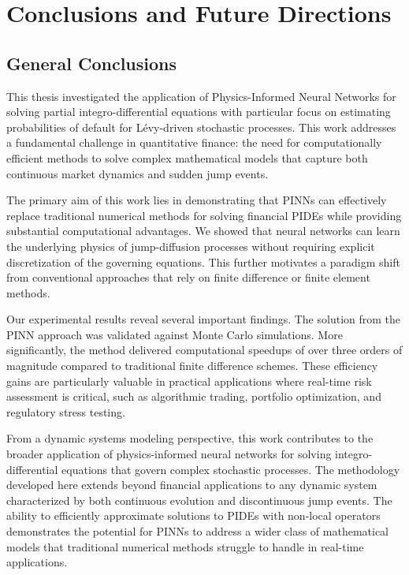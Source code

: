 \documentclass[11pt,twoside,openright]{report}
\begin{document}
\chapter{Conclusions and Future Directions}
\label{ch:conclusions}

\section{General Conclusions}

This thesis investigated the application of Physics-Informed Neural Networks for solving partial integro-differential equations with particular focus on estimating probabilities of default for Lévy-driven stochastic processes. This work addresses a fundamental challenge in quantitative finance: the need for computationally efficient methods to solve complex mathematical models that capture both continuous market dynamics and sudden jump events.

The primary aim of this work lies in demonstrating that PINNs can effectively replace traditional numerical methods for solving financial PIDEs while providing substantial computational advantages. We showed that neural networks can learn the underlying physics of jump-diffusion processes without requiring explicit discretization of the governing equations. This further motivates a paradigm shift from conventional approaches that rely on finite difference or finite element methods.

Our experimental results reveal several important findings. The solution from the PINN approach was validated against Monte Carlo simulations. More significantly, the method delivered computational speedups of over three orders of magnitude compared to traditional finite difference schemes. These efficiency gains are particularly valuable in practical applications where real-time risk assessment is critical, such as algorithmic trading, portfolio optimization, and regulatory stress testing.

From a dynamic systems modeling perspective, this work contributes to the broader application of physics-informed neural networks for solving integro-differential equations that govern complex stochastic processes. The methodology developed here extends beyond financial applications to any dynamic system characterized by both continuous evolution and discontinuous jump events. The ability to efficiently approximate solutions to PIDEs with non-local operators demonstrates the potential for PINNs to address a wider class of mathematical models that traditional numerical methods struggle to handle in real-time applications.
\end{document}
